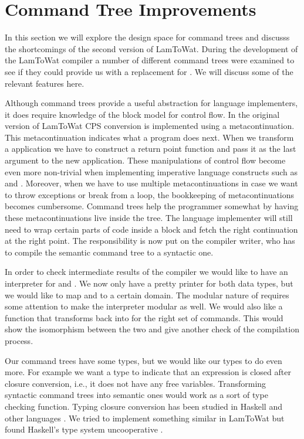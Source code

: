 \section{\label{section:ctreebetter}Command Tree Improvements}
In this section we will explore the design space for command trees and discusss the shortcomings of the second version of LamToWat. During the development of the LamToWat compiler a number of different command trees were examined to see if they could provide us with a replacement for . We will discuss some of the relevant features here.

Although command trees provide a useful abstraction for language implementers, it does require knowledge of the block model for control flow. In the original version of LamToWat CPS conversion is implemented using a metacontinuation. This metacontinuation indicates what a program does next. When we transform a application we have to construct a return point function and pass it as the last argument to the new application. These manipulations of control flow become even more non-trivial when implementing imperative language constructs such as  and . Moreover, when we have to use multiple metacontinuations in case we want to throw exceptions or break from a  loop, the bookkeeping of metacontinuations becomes cumbersome. Command trees help the programmer somewhat by having these metacontinuations live inside the tree. The language implementer will still need to wrap certain parts of code inside a block and fetch the right continuation at the right point. The responsibility is now put on the compiler writer, who has to compile the semantic command tree to a syntactic one.

In order to check intermediate results of the compiler we would like to have an interpreter for  and . We now only have a pretty printer for both data types, but we would like to map  and  to a certain domain. The modular nature of  requires some attention to make the interpreter modular as well. We would also like a function that transforms  back into  for the right set of commands. This would show the isomorphism between the two and give another check of the compilation process.

Our command trees have some types, but we would like our types to do even more. For example we want a type to indicate that an expression is closed after closure conversion, i.e., it does not have any free variables. Transforming syntactic command trees into semantic ones would work as a sort of type checking function. Typing closure conversion has been studied in Haskell and other languages \autocite{DBLP:conf/haskell/GuillemetteM07, DBLP:conf/pldi/Chlipala07, DBLP:conf/popl/MorrisettWCG98}. We tried to implement something similar in LamToWat but found Haskell's type system uncooperative \autocite{10.1145/2578854.2503786}.

